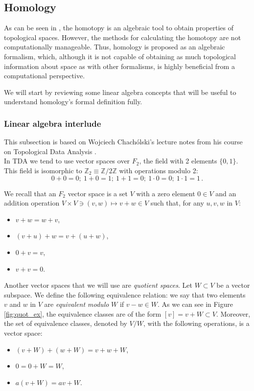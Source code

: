 \documentclass[../main.tex]{subfiles}
\begin{document}
\subsection{Homology}
As can be seen in \cite{hatcher_algebraic_2002}, the homotopy is an algebraic tool to obtain properties of topological spaces. However, the methods for calculating the homotopy are not computationally manageable. Thus, homology is proposed as an algebraic formalism, which, although it is not capable of obtaining as much topological information about space as with other formalisms, is highly beneficial from a computational perspective.

We will start by reviewing some linear algebra concepts that will be useful to understand homology's formal definition fully.

\subsubsection*{Linear algebra interlude}
This subsection is based on Wojciech Chachólski's lecture notes from his course on Topological Data Analysis \cite{chacholski_sf2956_2022}.\\

In TDA we tend to use vector spaces over $F_2$, the field with 2 elements $\{0,1\}$. This field is isomorphic to $\mathbb{Z}_2 \equiv \mathbb{Z}/2\mathbb{Z}$ with operations modulo 2:
\[
0+0 = 0;\ 1+0 = 1;\ 1+1 = 0;\ 1 \cdot 0 = 0;\ 1\cdot 1 = 1\,.
\]

We recall that an $F_2$ vector space is a set $V$ with a zero element $0 \in V$ and an addition operation $V \times V \ni (v,w) \mapsto v+w \in V$ such that, for any $u,v,w$ in $V$:
\begin{itemize}
    \item $v + w = w + v$,
    \item $(v + u) + w = v + (u + w)$,
    \item $0 + v = v$,
    \item $v + v = 0$.
\end{itemize}

Another vector spaces that we will use are \emph{quotient spaces}. Let $W \subset V$ be a vector subspace. We define the following equivalence relation: we say that two elements $v$ and $w$ in $V$ are \emph{equivalent modulo} $W$ if $v-w \in W$. As we can see in Figure \ref{fig:quot_ex}, the equivalence classes are of the form $[v]=v+W \subset V$. Moreover, the set of equivalence classes, denoted by $V/W$, with the following operations, is a vector space:
\begin{itemize}
    \item $(v+W)+(w+W)=v+w+W$,
    \item $0 = 0 +W = W$,
    \item $a(v+W)=av +W$.
\end{itemize}
\end{document}
